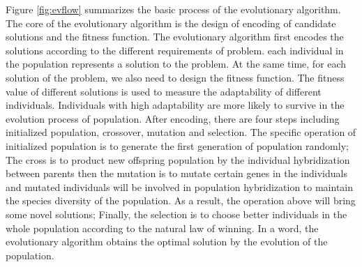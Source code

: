 Figure \ref{fig:evflow} summarizes the basic process of the evolutionary algorithm. The core 
of the evolutionary algorithm is the design of encoding of candidate 
solutions and the fitness function. The evolutionary algorithm first encodes 
the solutions according to the different requirements of problem. each 
individual in the population represents a solution to the problem. At the 
same time, for each solution of the problem, we also need to design the 
fitness function. The fitness value of different solutions is used to measure 
the adaptability of different individuals. Individuals with high adaptability 
are more likely to survive in the evolution process of population. After 
encoding, there are four steps including initialized population, crossover, 
mutation and selection. The specific operation of initialized population is 
to generate the first generation of population randomly; The cross is to 
product new offspring population by the individual hybridization between 
parents then the mutation is to mutate certain genes in the individuals and 
mutated individuals will be involved in population hybridization to maintain 
the species diversity of the population. As a result, the operation above 
will bring some novel solutions; Finally, the selection is to choose better 
individuals in the whole population according to the natural law of winning. 
In a word, the evolutionary algorithm obtains the optimal solution by the 
evolution of the population.



